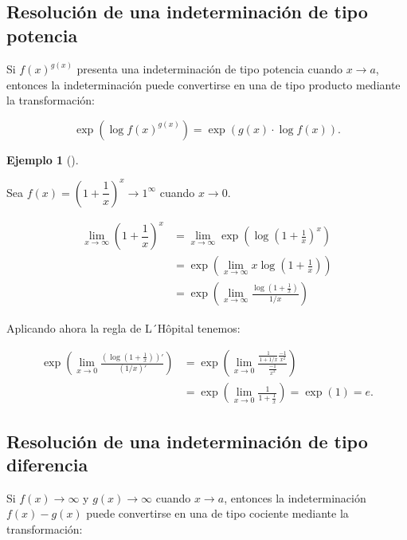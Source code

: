 \documentclass[
  a4paper,
]{scrreport}
\theoremstyle{definition}
\theoremstyle{definition}
\newtheorem{example}{Ejemplo}[chapter]
\theoremstyle{definition}
\theoremstyle{plain}
\theoremstyle{plain}
\theoremstyle{plain}
\theoremstyle{remark}
\begin{document}
\subsection{Resolución de una indeterminación de tipo
potencia}\label{resoluciuxf3n-de-una-indeterminaciuxf3n-de-tipo-potencia}

Si \(f(x)^{g(x)}\) presenta una indeterminación de tipo potencia cuando
\(x\to a\), entonces la indeterminación puede convertirse en una de tipo
producto mediante la transformación:

\[\exp\left(\log f(x)^{g(x)}\right) = \exp\left(g(x)\cdot \log f(x)\right).\]

\begin{example}[]\protect\hypertarget{exm-solucion-indeterminacion-producto}{}\label{exm-solucion-indeterminacion-producto}

Sea \(f(x)=\left(1+\dfrac{1}{x}\right)^{x} \to 1^\infty\) cuando
\(x\to 0\).

\begin{align*}
\lim_{x\to \infty}\left(1+\dfrac{1}{x}\right)^{x} 
&= \lim_{x\to \infty}\exp\left(\log\left(1+\frac{1}{x}\right)^{x}\right)\\ 
&= \exp\left(\lim_{x\to \infty}x\log\left(1+\frac{1}{x}\right)\right)\\
&= \exp\left(\lim_{x\to \infty}\frac{\log\left(1+\frac{1}{x}\right)}{1/x}\right)
\end{align*}

Aplicando ahora la regla de L´Hôpital tenemos:

\begin{align*}
\exp\left(\lim_{x\to 0}\frac{\left(\log\left(1+\frac{1}{x}\right)\right)'}{\left(1/x\right)'}\right) &=
\exp\left(\lim_{x\to 0}\frac{\frac{1}{1+1/x}\frac{-1}{x^2}}{\frac{-1}{x^2}}\right) \\ 
&=
\exp\left(\lim_{x\to 0}\frac{1}{1+\frac{1}{x}}\right)=\exp(1)=e.
\end{align*}

\end{example}

\subsection{Resolución de una indeterminación de tipo
diferencia}\label{resoluciuxf3n-de-una-indeterminaciuxf3n-de-tipo-diferencia}

Si \(f(x)\to \infty\) y \(g(x)\to \infty\) cuando \(x\to a\), entonces
la indeterminación \(f(x)-g(x)\) puede convertirse en una de tipo
cociente mediante la transformación:
\end{document}
